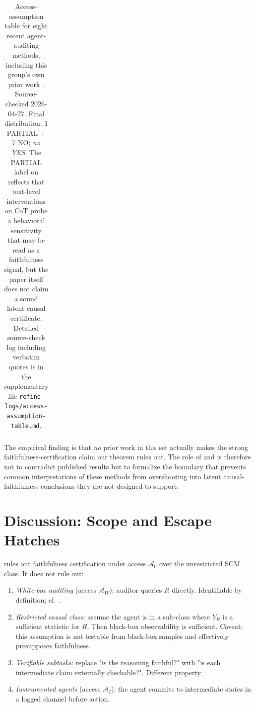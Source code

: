\documentclass{article}
\theoremstyle{plain}
\theoremstyle{definition}
\theoremstyle{remark}
\begin{document}
\begin{table}[h]
\begin{tabular}{p{3.6cm}p{3.4cm}p{3.4cm}c}
\bottomrule
\end{tabular}
\caption{Access-assumption table for eight recent agent-auditing methods,
including this group's own prior work \citep{zhang2026ownerharm}.
Source-checked 2026-04-27. Final distribution: 1 PARTIAL + 7 NO; \emph{no YES}.
The PARTIAL label on \citet{lanham2023measuring} reflects that text-level
interventions on CoT probe a behavioral sensitivity that may be read as a
faithfulness signal, but the paper itself does not claim a sound latent-causal
certificate. Detailed source-check log including verbatim quotes is in the
supplementary file \texttt{refine-logs/access-assumption-table.md}.}
\label{tab:access-table}
\end{table}

The empirical finding is that \emph{no} prior work in this set actually makes
the strong faithfulness-certification claim our theorem rules out. The role of
 and  is therefore not to
contradict published results but to formalize the boundary that prevents
common interpretations of these methods from overshooting into latent
causal-faithfulness conclusions they are not designed to support.

\section{Discussion: Scope and Escape Hatches}\label{sec:discussion}

 rules out faithfulness certification under access
$\mathcal{A}_0$ over the unrestricted SCM class. It does not rule out:
\begin{enumerate}
  \item \emph{White-box auditing} (access $\mathcal{A}_W$): auditor queries
    $R$ directly. Identifiable by definition; cf.\ \citet{geiger2022inducing,geiger2023causal}.
  \item \emph{Restricted causal class}: assume the agent is in a sub-class
    where $Y_R$ is a sufficient statistic for $R$. Then black-box observability
    is sufficient. Caveat: this assumption is not testable from black-box
    samples and effectively presupposes faithfulness.
  \item \emph{Verifiable subtasks}: replace "is the reasoning faithful?" with
    "is each intermediate claim externally checkable?". Different property.
  \item \emph{Instrumented agents} (access $\mathcal{A}_I$): the agent commits
    to intermediate states in a logged channel before action.
\end{enumerate}
\end{document}

